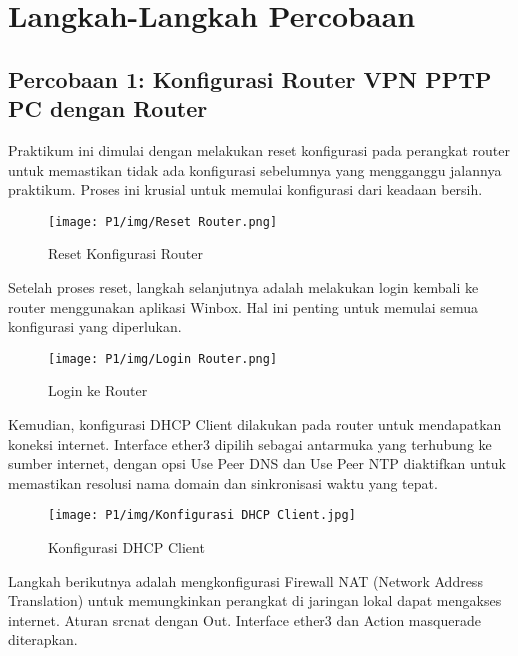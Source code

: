 \section{Langkah-Langkah Percobaan}

\subsection*{Percobaan 1: Konfigurasi Router VPN PPTP PC dengan Router}

Praktikum ini dimulai dengan melakukan reset konfigurasi pada perangkat router untuk memastikan tidak ada konfigurasi sebelumnya yang mengganggu jalannya praktikum. Proses ini krusial untuk memulai konfigurasi dari keadaan bersih.

\begin{figure}[H]
\centering
\begin{minipage}[b]{0.45\textwidth}
\texttt{[image: P1/img/Reset Router.png]}
\caption{Reset Konfigurasi Router}
\label{fig:reset_router}
\end{minipage}
\end{figure}

Setelah proses reset, langkah selanjutnya adalah melakukan login kembali ke router menggunakan aplikasi Winbox. Hal ini penting untuk memulai semua konfigurasi yang diperlukan.

\begin{figure}[H]
\centering
\begin{minipage}[b]{0.45\textwidth}
\texttt{[image: P1/img/Login Router.png]}
\caption{Login ke Router}
\label{fig:login_router}
\end{minipage}
\end{figure}

Kemudian, konfigurasi DHCP Client dilakukan pada router untuk mendapatkan koneksi internet. Interface ether3 dipilih sebagai antarmuka yang terhubung ke sumber internet, dengan opsi Use Peer DNS dan Use Peer NTP diaktifkan untuk memastikan resolusi nama domain dan sinkronisasi waktu yang tepat.

\begin{figure}[H]
\centering
\begin{minipage}[b]{0.45\textwidth}
\texttt{[image: P1/img/Konfigurasi DHCP Client.jpg]}
\caption{Konfigurasi DHCP Client}
\label{fig:dhcp_client}
\end{minipage}
\end{figure}

Langkah berikutnya adalah mengkonfigurasi Firewall NAT (Network Address Translation) untuk memungkinkan perangkat di jaringan lokal dapat mengakses internet. Aturan srcnat dengan Out. Interface ether3 dan Action masquerade diterapkan.

